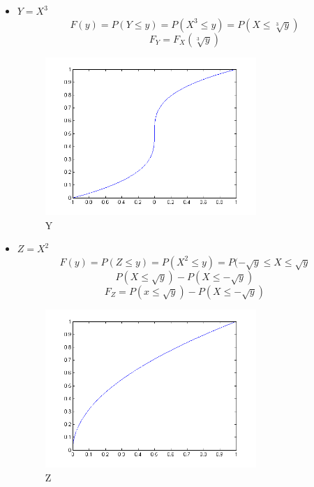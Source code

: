 \documentclass[12pt]{article}
\begin{document}
\begin{description}
\begin {itemize}
   \item 

   $Y = X^{3}$
   $$F(y) = P(Y \leq y) = P(X^{3} \leq y) = P(X \leq \sqrt[3]{y})$$
   $$F_{Y} = F_{X}(\sqrt[3]{y})$$

\begin{figure}[h]
	\centering
   
		\includegraphics[width=8cm]{bY}
		\caption{Y}
\end{figure}
   
   \item
   
   $Z = X^{2}$
   $$F(y) = P(Z \leq y) = P(X^{2} \leq y) = P(-\sqrt{y} \leq X \leq \sqrt{y}$$
   $$P(X \leq \sqrt{y}) - P(X \leq -\sqrt{y})$$
   $$F_{Z} = P(x \leq \sqrt{y}) - P(X \leq -\sqrt{y})$$
     \begin{figure}[h]
	\centering
   
		\includegraphics[width=8cm]{bZ}
		\caption{Z}
\end{figure}  

   
   \end {itemize}
\end{description}
\end{document}
